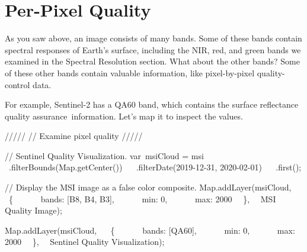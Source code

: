 \documentclass[
  letterpaper,
  DIV=11,
  numbers=noendperiod]{scrreprt}
\newenvironment{Shaded}{\begin{snugshade}}{\end{snugshade}}
\newcommand{\AttributeTok}[1]{\textcolor[rgb]{0.40,0.45,0.13}{#1}}
\newcommand{\BuiltInTok}[1]{\textcolor[rgb]{0.00,0.23,0.31}{#1}}
\newcommand{\CommentTok}[1]{\textcolor[rgb]{0.37,0.37,0.37}{#1}}
\newcommand{\DataTypeTok}[1]{\textcolor[rgb]{0.68,0.00,0.00}{#1}}
\newcommand{\DecValTok}[1]{\textcolor[rgb]{0.68,0.00,0.00}{#1}}
\newcommand{\ErrorTok}[1]{\textcolor[rgb]{0.68,0.00,0.00}{#1}}
\newcommand{\FunctionTok}[1]{\textcolor[rgb]{0.28,0.35,0.67}{#1}}
\newcommand{\NormalTok}[1]{\textcolor[rgb]{0.00,0.23,0.31}{#1}}
\newcommand{\OperatorTok}[1]{\textcolor[rgb]{0.37,0.37,0.37}{#1}}
\newcommand{\StringTok}[1]{\textcolor[rgb]{0.13,0.47,0.30}{#1}}
\begin{document}
\hypertarget{per-pixel-quality}{%
\section{Per-Pixel Quality}\label{per-pixel-quality}}

As you saw above, an image consists of many bands. Some of these bands
contain spectral responses of Earth's surface, including the NIR, red,
and green bands we examined in the Spectral Resolution section. What
about the other bands? Some of these other bands contain valuable
information, like pixel-by-pixel quality-control data.

For example, Sentinel-2 has a QA60 band, which contains the surface
reflectance quality assurance~information. Let's map it to inspect the
values.

\begin{Shaded}
\begin{Highlighting}[]
\CommentTok{/////  }
\CommentTok{// Examine pixel quality  }
\CommentTok{/////  }
  
\CommentTok{// Sentinel Quality Visualization.  }
\NormalTok{var msiCloud }\OperatorTok{=}\NormalTok{ msi  }\AttributeTok{ }\OperatorTok{.}\FunctionTok{filterBounds}\NormalTok{(}\BuiltInTok{Map}\OperatorTok{.}\FunctionTok{getCenter}\NormalTok{())  }
  \AttributeTok{ }\OperatorTok{.}\FunctionTok{filterDate}\NormalTok{(}\StringTok{\textquotesingle{}2019{-}12{-}31\textquotesingle{}}\OperatorTok{,} \StringTok{\textquotesingle{}2020{-}02{-}01\textquotesingle{}}\NormalTok{)  }
  \AttributeTok{ }\OperatorTok{.}\FunctionTok{first}\NormalTok{()}\OperatorTok{;}  
  
\CommentTok{// Display the MSI image as a false color composite.  }
\BuiltInTok{Map}\OperatorTok{.}\FunctionTok{addLayer}\NormalTok{(msiCloud}\OperatorTok{,}  
\NormalTok{   \{  }
      \DataTypeTok{ bands}\OperatorTok{:}\NormalTok{ [}\StringTok{\textquotesingle{}B8\textquotesingle{}}\OperatorTok{,} \StringTok{\textquotesingle{}B4\textquotesingle{}}\OperatorTok{,} \StringTok{\textquotesingle{}B3\textquotesingle{}}\NormalTok{]}\OperatorTok{,}  
      \DataTypeTok{ min}\OperatorTok{:} \DecValTok{0}\OperatorTok{,}  
      \DataTypeTok{ max}\OperatorTok{:} \DecValTok{2000}\ErrorTok{ }\NormalTok{  \}}\OperatorTok{,}   \StringTok{\textquotesingle{}MSI Quality Image\textquotesingle{}}\NormalTok{)}\OperatorTok{;}  
  
\BuiltInTok{Map}\OperatorTok{.}\FunctionTok{addLayer}\NormalTok{(msiCloud}\OperatorTok{,}  
\NormalTok{   \{  }
      \DataTypeTok{ bands}\OperatorTok{:}\NormalTok{ [}\StringTok{\textquotesingle{}QA60\textquotesingle{}}\NormalTok{]}\OperatorTok{,}  
      \DataTypeTok{ min}\OperatorTok{:} \DecValTok{0}\OperatorTok{,}  
      \DataTypeTok{ max}\OperatorTok{:} \DecValTok{2000}\ErrorTok{ }\NormalTok{  \}}\OperatorTok{,}   \StringTok{\textquotesingle{}Sentinel Quality Visualization\textquotesingle{}}\NormalTok{)}\OperatorTok{;}
\end{Highlighting}
\end{Shaded}
\end{document}
